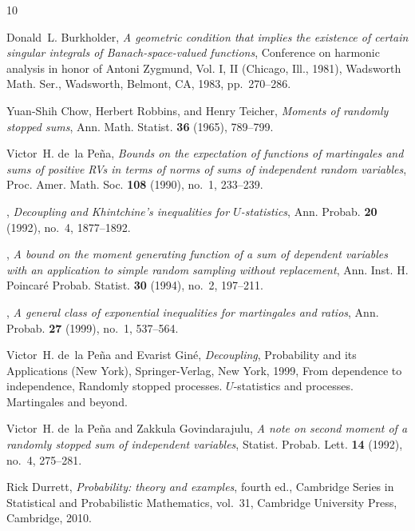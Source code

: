 \documentclass[ECP]{ejpecp} %
\begin{document}
\begin{thebibliography}{10}

Donald~L. Burkholder, \emph{A geometric condition that implies the existence of certain singular integrals of {B}anach-space-valued functions}, Conference on harmonic analysis in honor of {A}ntoni {Z}ygmund, {V}ol. {I}, {II} ({C}hicago, {I}ll., 1981), Wadsworth Math. Ser., Wadsworth, Belmont, CA, 1983, pp.~270--286. 

Yuan-Shih Chow, Herbert Robbins, and Henry Teicher, \emph{Moments of randomly stopped sums}, Ann. Math. Statist. \textbf{36} (1965), 789--799. 

Victor~H. de~la Pe\~na, \emph{Bounds on the expectation of functions of martingales and sums of positive {RV}s in terms of norms of sums of independent random variables}, Proc. Amer. Math. Soc. \textbf{108} (1990), no.~1, 233--239. 

\bysame, \emph{Decoupling and {K}hintchine's inequalities for {$U$}-statistics}, Ann. Probab. \textbf{20} (1992), no.~4, 1877--1892. 

\bysame, \emph{A bound on the moment generating function of a sum of dependent variables with an application to simple random sampling without replacement}, Ann. Inst. H. Poincar\'e Probab. Statist. \textbf{30} (1994), no.~2, 197--211. 

\bysame, \emph{A general class of exponential inequalities for martingales and ratios}, Ann. Probab. \textbf{27} (1999), no.~1, 537--564. 

Victor~H. de~la Pe\~na and Evarist Gin\'e, \emph{Decoupling}, Probability and its Applications (New York), Springer-Verlag, New York, 1999, From dependence to independence, Randomly stopped processes. $U$-statistics and processes. Martingales and beyond. 

Victor~H. de~la Pe\~na and Zakkula Govindarajulu, \emph{A note on second moment of a randomly stopped sum of independent variables}, Statist. Probab. Lett. \textbf{14} (1992), no.~4, 275--281. 

Rick Durrett, \emph{Probability: theory and examples}, fourth ed., Cambridge Series in Statistical and Probabilistic Mathematics, vol.~31, Cambridge University Press, Cambridge, 2010. 


\end{thebibliography}
\end{document}
